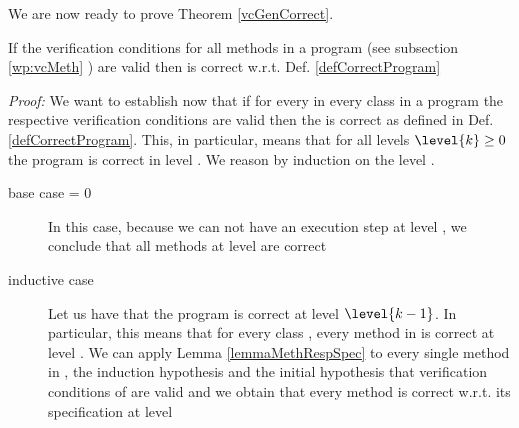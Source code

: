 We are now ready to prove Theorem \ref{vcGenCorrect}.\\
\begin{vcGenCorrect1}
 If the verification conditions  for all  methods in a program \Program{}  (see  subsection \ref{wp:vcMeth} )
are valid then \Program{} is correct w.r.t. Def. \ref{defCorrectProgram}
\end{vcGenCorrect1}
\textit{Proof:}
We want to establish now  that if for every \methodd{}
 in every class \class{} in a program \Program{}  the respective verification conditions are valid then 
the \Program{} is correct as defined in Def. \ref{defCorrectProgram}.
 This, in particular, means that for all levels $\level{k} \ge 0 $ the program is correct in  level .
We reason by induction on the level . 
\begin{description} 
\item[base case  = 0]
 In this case, because we can not have an execution step at level , we conclude that all methods at level  
are correct
\item[inductive case ] Let us have that the program is correct at level $\level{k-1}$. 
In particular, this means that for every class \class{}, every method \methodd{} in \class{} is correct at level .
We can apply Lemma \ref{lemmaMethRespSpec} to every single method  \methodd{} in \Program{}, 
 the induction hypothesis  and the initial hypothesis that  verification conditions  of \methodd{} are valid and we obtain that 
every method  \methodd{} is correct w.r.t. its specification at level  
\end{description}
\Qed







